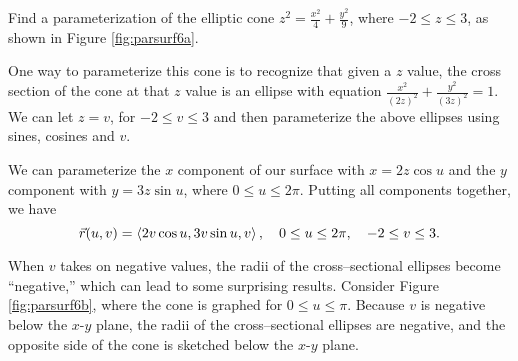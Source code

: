 {Find a parameterization of the elliptic cone $z^2 = \frac{x^2}{4}+\frac{y^2}{9}$, where $-2\leq z\leq 3$, as shown in Figure \ref{fig:parsurf6a}.
}
{One way to parameterize this cone is to recognize that given a $z$ value, the cross section of the cone at that $z$ value is an ellipse with equation $\frac{x^2}{(2z)^2} + \frac{y^2}{(3z)^2}=1$. We can let $z=v$, for $-2\leq v\leq 3$ and then parameterize the above ellipses using sines, cosines and $v$.

We can parameterize the $x$ component of our surface with $x=2z\cos u$ and the $y$ component with $y=3z\sin u$, where $0\leq u\leq 2\pi$. Putting all components together, we have
$$\vec r(u,v) = \left\langle 2v\cos u, 3v\sin u, v\right\rangle,\quad 0\leq u\leq 2\pi,\quad -2\leq v\leq 3.$$



When $v$ takes on negative values, the radii of the cross--sectional ellipses become ``negative,'' which can lead to some surprising results. Consider Figure \ref{fig:parsurf6b}, where the cone is graphed for $0\leq u\leq \pi$. Because $v$ is negative below the $x$-$y$ plane, the radii of the cross--sectional ellipses are negative, and the opposite side of the cone is sketched below the $x$-$y$ plane.
}\\

